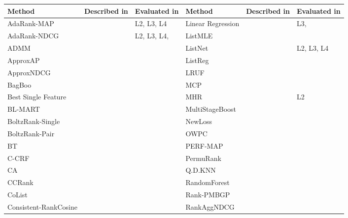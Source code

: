 \documentclass{sig-alternate}
\begin{document}
\label{app:ltr_methods_used}
\label{app:raw_data}
\begin{table}[!hpt]
\scriptsize{
\begin{tabular}{lll|lll}\toprule
Method & Described in & Evaluated in & Method & Described in & Evaluated in\\
\midrule
AdaRank-MAP & \cite{Xu2007} & L2, L3, L4 & Linear Regression & \cite{Cossock2006} & L3, \cite{Wang2012, Volkovs2011} \\ 
AdaRank-NDCG & \cite{Xu2007} & L2, L3, L4,  \cite{Busa-Fekete2013,Tan2013} & ListMLE & \cite{Xia2008} & \cite{Lin2010, Lin2011, Gao2014} \\ 
ADMM & \cite{Duh2011} & \cite{Duh2011} & ListNet & \cite{Cao2007} & L2, L3, L4 \\ 
ApproxAP & \cite{Qin2010b} & \cite{Qin2010b} & ListReg & \cite{Wu2011} & \cite{Wu2011} \\ 
ApproxNDCG & \cite{Qin2010b} & \cite{Qin2010b} & LRUF & \cite{Torkestani2012b} & \cite{Torkestani2012b} \\ 
BagBoo & \cite{Pavlov2010} & \cite{Ganjisaffar2011c} & MCP & \cite{Laporte2013} & \cite{Laporte2013} \\ 
Best Single Feature &  & \cite{Gomes2013} & MHR & \cite{Qin2007} & L2 \\ 
BL-MART & \cite{Ganjisaffar2011c} & \cite{Ganjisaffar2011c} & MultiStageBoost & \cite{Kao2013} & \cite{Kao2013} \\ 
BoltzRank-Single & \cite{Volkovs2009} & \cite{Volkovs2009, Volkovs2013} & NewLoss & \cite{Peng2010} & \cite{Peng2010} \\ 
BoltzRank-Pair & \cite{Volkovs2009} & \cite{Volkovs2009, Ganjisaffar2011c, Volkovs2013} & OWPC & \cite{Usunier2009} & \cite{Usunier2009} \\ 
BT & \cite{Zhou2008} & \cite{Zhou2008} & PERF-MAP & \cite{Pan2011} & \cite{Torkestani2012b} \\ 
C-CRF & \cite{Qin2008b} & \cite{Qin2008b} & PermuRank & \cite{Xu2008} & \cite{Xu2008} \\ 
CA & \cite{Metzler2007} & \cite{Busa-Fekete2013,Tan2013} & Q.D.KNN & \cite{Geng2008} & \cite{Wang2013} \\ 
CCRank & \cite{Wang2011c} & \cite{Wang2011c} & RandomForest &  & \cite{Gomes2013} \\ 
CoList & \cite{Gao2014} & \cite{Gao2014} & Rank-PMBGP & \cite{Sato2013} & \cite{Sato2013} \\ 
Consistent-RankCosine & \cite{Ravikumar2011} & \cite{Tan2013} & RankAggNDCG & \cite{Wang2013} & \cite{Wang2013} \\ 

\end{tabular}}
\end{table}
\end{document}
